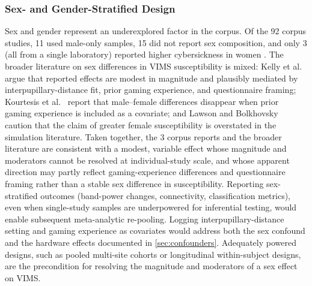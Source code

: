 \subsubsection{Sex- and Gender-Stratified Design}
Sex and gender represent an underexplored factor in the corpus.
Of the 92 corpus studies, 11 used male-only samples, 15 did not report sex composition, and only 3 (all from a single laboratory) reported higher cybersickness in women \cite{bergerSexDifferencesUser2021, bergerInfluencePlaceboTDCS2024, bergerManipulatingCybersicknessVirtual2025}.
The broader literature on sex differences in VIMS susceptibility is mixed: Kelly et al.~\cite{kellyGenderDifferencesCybersickness2023} argue that reported effects are modest in magnitude and plausibly mediated by interpupillary-distance fit, prior gaming experience, and questionnaire framing; Kourtesis et al.~\cite{kourtesisCybersicknessCognitionMotor2023} report that male--female differences disappear when prior gaming experience is included as a covariate; and Lawson and Bolkhovsky~\cite{lawsonAttentionMilitaryCommercial2023} caution that the claim of greater female susceptibility is overstated in the simulation literature.
Taken together, the 3 corpus reports and the broader literature are consistent with a modest, variable effect whose magnitude and moderators cannot be resolved at individual-study scale, and whose apparent direction may partly reflect gaming-experience differences and questionnaire framing rather than a stable sex difference in susceptibility.
Reporting sex-stratified outcomes (band-power changes, connectivity, classification metrics), even when single-study samples are underpowered for inferential testing, would enable subsequent meta-analytic re-pooling.
Logging interpupillary-distance setting and gaming experience as covariates would address both the sex confound and the hardware effects documented in \autoref{sec:confounders}.
Adequately powered designs, such as pooled multi-site cohorts or longitudinal within-subject designs, are the precondition for resolving the magnitude and moderators of a sex effect on VIMS.

